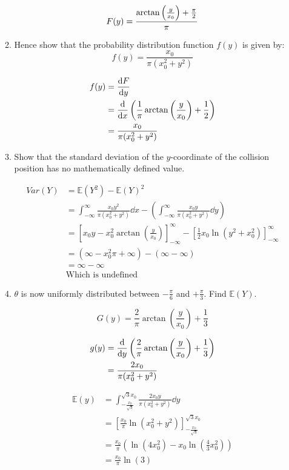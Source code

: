\documentclass[10pt,\jkfside,a4paper]{article}
\begin{document}
\begin{enumerate}
\begin{enumerate}
\[
F(y) = \frac{\arctan{\left(\frac{y}{x_0}\right)} + \frac{\pi}{2}}{\pi} \\
\]

\item
Hence show that the probability distribution function $f(y)$ is given by:
\[
f(y) = \frac{x_0}{\pi(x_0^2 + y^2)}
\]

\[
\begin{split}
f(y) &= \dv{F}{y} \\
     &= \dv{x}\left(\frac{1}{\pi}\arctan\left(\frac{y}{x_0}\right) + \frac{1}{2}\right) \\
     &= \frac{x_0}{\pi(x_0^2 + y^2)} \\
\end{split}
\]

\item
Show that the standard deviation of the $y$-coordinate of the collision position
has no mathematically defined value.

\[
\begin{split}
Var(Y) &= \mathbb{E}(Y^2) - \mathbb{E}(Y)^2 \\
       &= \int^{\infty}_{-\infty} \frac{x_0 y^2}{\pi(x_0^2 + y^2)} \dd{x} - \left(\int^{\infty}_{-\infty}
\frac{x_0 y}{\pi(x_0^2 + y^2)}\dd{y}\right) \\
      &= \left[x_0 y - x_0^2 \arctan\left(\frac{y}{x_0}\right) \right]^{\infty}_{-\infty} -
\left[\frac{1}{2}x_0\ln\left(y^2 + x_0^2\right)\right]^{\infty}_{-\infty} \\
&= (\infty - x_0^2\pi + \infty) - (\infty - \infty) \\
&= \infty - \infty \\
& \text{Which is undefined}
\end{split}
\]

\item
$\theta$ is now uniformly distributed between $-\frac{\pi}{6}$ and $+\frac{\pi}{3}$.
Find $\mathbb{E}(Y)$.

\[
G(y) = \frac{2}{\pi}\arctan\left(\frac{y}{x_0}\right) + \frac{1}{3}
\]

\[
\begin{split}
g(y) &= \dv{y}\left(\frac{2}{\pi}\arctan\left(\frac{y}{x_0}\right) + \frac{1}{3}\right) \\
     &= \frac{2x_0}{\pi(x_0^2 + y^2)} \\
\end{split}
\]

\[
\begin{split}
\mathbb{E}(y) &= \int^{\sqrt{3}x_0}_{-\frac{x_0}{\sqrt{3}}} \frac{2x_0 y}{\pi(x_0^2 + y^2)} \dd{y} \\
              &= \left[\frac{x_0}{\pi} \ln\left(x_0^2 + y^2\right)\right]^{\sqrt{3}x_0}_{-\frac{x_0}{\sqrt{3}}} \\
              &= \frac{x_0}{\pi} \left(\ln\left(4x_0^2\right) - x_0 \ln\left(\frac{4}{3}x_0^2\right)\right) \\
              &= \frac{x_0}{\pi} \ln(3) \\
\end{split}
\]


\end{enumerate}
\end{enumerate}
\end{document}
